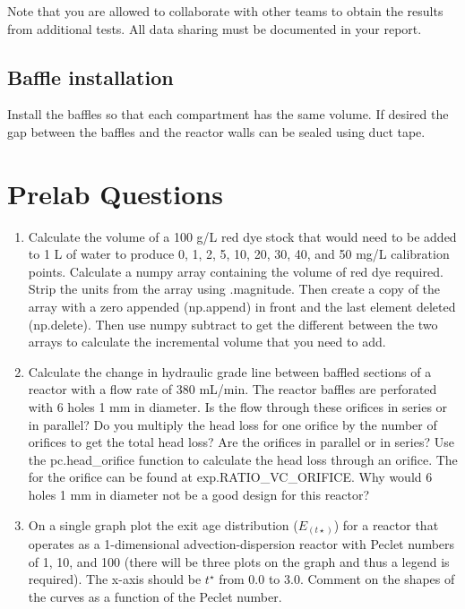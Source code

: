 \documentclass[letterpaper,10pt,english]{sphinxmanual}
\begin{document}
Note that you are allowed to collaborate with other teams to obtain the results from additional tests. All data sharing must be documented in your report.


\subsection{Baffle installation}
\label{\detokenize{Reactor_Characteristics/Reactor_Characteristics:baffle-installation}}
Install the baffles so that each compartment has the same volume. If desired the gap between the baffles and the reactor walls can be sealed using duct tape.


\section{Prelab Questions}
\label{\detokenize{Reactor_Characteristics/Reactor_Characteristics:prelab-questions}}\label{\detokenize{Reactor_Characteristics/Reactor_Characteristics:heading-reactor-pre-laboratory-questions}}\begin{enumerate}
\item {} 
Calculate the  volume of a 100 g/L red dye stock that would need to be added to 1 L of water to produce 0, 1, 2, 5, 10, 20, 30, 40, and 50 mg/L calibration points. Calculate a numpy array containing the  volume of red dye required. Strip the units from the array using .magnitude. Then create a copy of the array with a zero appended (np.append) in front and the last element deleted (np.delete). Then use numpy subtract to get the different between the two arrays to calculate the incremental volume that you need to add.

\item {} 
Calculate the change in hydraulic grade line between baffled sections of a reactor with a flow rate of 380 mL/min. The reactor baffles are perforated with 6 holes 1 mm in diameter. Is the flow through these orifices in series or in parallel? Do you multiply the head loss for one orifice by the number of orifices to get the total head loss? Are the orifices in parallel or in series? Use the pc.head\_orifice function to calculate the head loss through an orifice. The  for the orifice can be found at exp.RATIO\_VC\_ORIFICE. Why would 6 holes 1 mm in diameter not be a good design for this reactor?

\item {} 
On a single graph plot the exit age distribution (\(E_{(t\star)}\)) for a reactor that operates as a 1-dimensional advection-dispersion reactor with Peclet numbers of 1, 10, and 100 (there will be three plots on the graph and thus a legend is required). The x-axis should be \(t^\star\) from 0.0 to 3.0. Comment on the shapes of the curves as a function of the Peclet number.

\end{enumerate}
\end{document}
